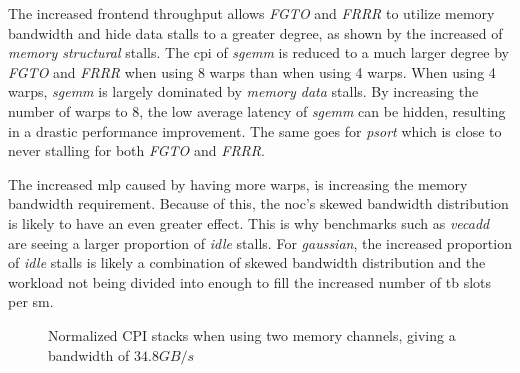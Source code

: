 The increased frontend throughput allows \textit{FGTO} and \textit{FRRR} to utilize memory bandwidth and hide data stalls to a greater degree, as shown by the increased  of \textit{memory structural} stalls. The \acrshort{cpi} of \textit{sgemm} is reduced to a much larger degree by \textit{FGTO} and \textit{FRRR} when using 8 warps than when using 4 warps. When using 4 warps, \textit{sgemm} is largely dominated by \textit{memory data} stalls. By increasing the number of warps to 8, the low average latency of \textit{sgemm} can be hidden, resulting in a drastic performance improvement. The same goes for \textit{psort} which is close to never stalling for both \textit{FGTO} and \textit{FRRR}.

The increased \acrshort{mlp} caused by having more warps, is increasing the memory bandwidth requirement. Because of this, the \acrshort{noc}'s skewed bandwidth distribution is likely to have an even greater effect. This is why benchmarks such as \textit{vecadd} are seeing a larger proportion of \textit{idle} stalls. For \textit{gaussian}, the increased proportion of \textit{idle} stalls is likely a combination of skewed bandwidth distribution and the workload not being divided into enough  to fill the increased number of \acrshort{tb} slots per \acrshort{sm}.   

\begin{figure}
    \centering
    \caption[Normalized \acrshort{cpi} stacks with double the available memory bandwidth]{Normalized CPI stacks when using two memory channels, giving a bandwidth of $34.8GB/s$}
    \label{fig:2channel_memory}
\end{figure}

